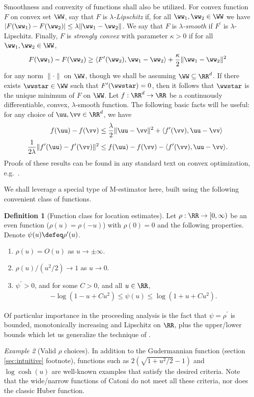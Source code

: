 \documentclass[11pt,oneside]{article}
\theoremstyle{definition} \newtheorem{defn}{Definition}       %
\theoremstyle{plain} \newtheorem{prop}[defn]{Proposition}           %
\theoremstyle{plain} \newtheorem{thm}[defn]{Theorem}                %
\theoremstyle{plain} \newtheorem{lem}[defn]{Lemma}                  %
\theoremstyle{plain} \newtheorem{cor}[defn]{Corollary}              %
\theoremstyle{remark} \newtheorem{rmk}[defn]{Remark}                %
\theoremstyle{remark} \newtheorem{ex}[defn]{Example}                %
\begin{document}
Smoothness and convexity of functions shall also be utilized. For convex function $F$ on convex set $\WW$, say that $F$ is $\lambda$\textit{-Lipschitz} if, for all $\ww_{1},\ww_{2} \in \WW$ we have $|F(\ww_{1})-F(\ww_{2})| \leq \lambda \|\ww_{1}-\ww_{2}\|$. We say that $F$ is $\lambda$\textit{-smooth} if $F^{\prime}$ is $\lambda$-Lipschitz. Finally, $F$ is \textit{strongly convex} with parameter $\kappa > 0$ if for all $\ww_{1},\ww_{2} \in \WW$,
%
\begin{align*}
F(\ww_{1})-F(\ww_{2}) \geq \langle F^{\prime}(\ww_{2}), \ww_{1}-\ww_{2} \rangle + \frac{\kappa}{2}\|\ww_{1}-\ww_{2}\|^{2}
\end{align*}
%
for any norm $\|\cdot\|$ on $\WW$, though we shall be assuming $\WW \subseteq \RR^{d}$. If there exists $\wwstar \in \WW$ such that $F^{\prime}(\wwstar)=0$, then it follows that $\wwstar$ is the unique minimum of $F$ on $\WW$. Let $f:\RR^{d} \to \RR$ be a continuously differentiable, convex, $\lambda$-smooth function. The following basic facts will be useful: for any choice of $\uu,\vv \in \RR^{d}$, we have
%
\begin{align}
\label{eqn:facts_CO_1}
f(\uu)-f(\vv) & \leq \frac{\lambda}{2}\|\uu-\vv\|^{2} + \langle f^{\prime}(\vv), \uu-\vv \rangle\\
\label{eqn:facts_CO_2}
\frac{1}{2\lambda}\|f^{\prime}(\uu)-f^{\prime}(\vv)\|^{2} & \leq f(\uu)-f(\vv) - \langle f^{\prime}(\vv), \uu-\vv \rangle.
\end{align}
%
Proofs of these results can be found in any standard text on convex optimization, e.g.~\citep{nesterov2004ConvOpt}.

We shall leverage a special type of M-estimator here, built using the following convenient class of functions.
%
\begin{defn}[Function class for location estimates]\label{defn:rho}
Let $\rho:\RR \to [0,\infty)$ be an even function ($\rho(u)=\rho(-u)$) with $\rho(0)=0$ and the following properties. Denote $\psi(u) \defeq \rho^{\prime}(u)$.
%
\begin{enumerate}
\item $\rho(u) = O(u)$ as $u \to \pm\infty$.
\item $\rho(u)/(u^{2}/2) \to 1$ as $u \to 0$.
\item $\psi^{\prime} > 0$, and for some $C>0$, and all $u \in \RR$,
\begin{align*}
-\log(1-u+Cu^{2}) \leq \psi(u) \leq \log(1+u+Cu^{2}).
\end{align*}
\end{enumerate}
\end{defn}
%
\noindent Of particular importance in the proceeding analysis is the fact that $\psi=\rho^{\prime}$ is bounded, monotonically increasing and Lipschitz on $\RR$, plus the upper/lower bounds which let us generalize the technique of \citet{catoni2012a}.
%
\begin{ex}[Valid $\rho$ choices]
In addition to the Gudermannian function (section \ref{sec:intuitive} footnote), functions such as $2(\sqrt{1+u^{2}/2}-1)$ and $\log\cosh(u)$ are well-known examples that satisfy the desired criteria. Note that the wide/narrow functions of Catoni do not meet all these criteria, nor does the classic Huber function.
\end{ex}
\end{document}
